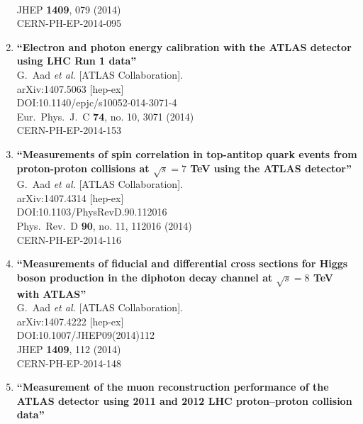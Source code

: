 \documentclass{article}
\begin{document}
\begin{enumerate}
  \\{}JHEP {\bf 1409}, 079 (2014)
  \\{}CERN-PH-EP-2014-095
\item%
{\bf ``Electron and photon energy calibration with the ATLAS detector using LHC Run 1 data''}
  \\{}G.~Aad {\it et al.} [ATLAS Collaboration].
  \\{}arXiv:1407.5063 [hep-ex]
  \\{}DOI:10.1140/epjc/s10052-014-3071-4
  \\{}Eur.\ Phys.\ J.\ C {\bf 74}, no. 10, 3071 (2014)
  \\{}CERN-PH-EP-2014-153
\item%
{\bf ``Measurements of spin correlation in top-antitop quark events from proton-proton collisions at $\sqrt{s}=7$ TeV using the ATLAS detector''}
  \\{}G.~Aad {\it et al.} [ATLAS Collaboration].
  \\{}arXiv:1407.4314 [hep-ex]
  \\{}DOI:10.1103/PhysRevD.90.112016
  \\{}Phys.\ Rev.\ D {\bf 90}, no. 11, 112016 (2014)
  \\{}CERN-PH-EP-2014-116
\item%
{\bf ``Measurements of fiducial and differential cross sections for Higgs boson production in the diphoton decay channel at $\sqrt{s}=8$ TeV with ATLAS''}
  \\{}G.~Aad {\it et al.} [ATLAS Collaboration].
  \\{}arXiv:1407.4222 [hep-ex]
  \\{}DOI:10.1007/JHEP09(2014)112
  \\{}JHEP {\bf 1409}, 112 (2014)
  \\{}CERN-PH-EP-2014-148
\item%
{\bf ``Measurement of the muon reconstruction performance of the ATLAS detector using 2011 and 2012 LHC proton–proton collision data''}

\end{enumerate}
\end{document}

